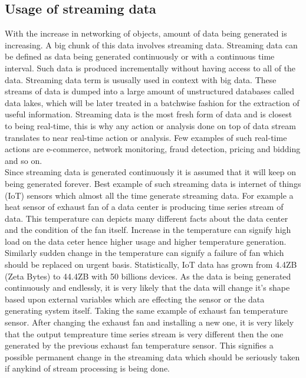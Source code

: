 \documentclass[12pt]{article}
\begin{document}
\subsection{Usage of streaming data}
With the increase in networking of objects, amount of data being generated is increasing. A big chunk of this data involves streaming data. Streaming data can be defined as data being generated continuously or with a continuous time interval. Such data is produced incrementally without having access to all of the data. Streaming data term is ususally used in context with big data. These streams of data is dumped into a large amount of unstructured databases called data lakes, which will be later treated in a batchwise fashion for the extraction of useful information. Streaming data is the most fresh form of data and is closest to being real-time, this is why any action or analysis done on top of data stream translates to near real-time action or analysis. Few examples of such real-time actions are e-commerce, network monitoring, fraud detection, pricing and bidding and so on.\\
\break
Since streaming data is generated continuously it is assumed that it will keep on being generated forever. Best example of such streaming data is internet of things (IoT) sensors which almost all the time generate streaming data. For example a heat sensor of exhaust fan of a data center is producing time series stream of data. This temperature can depicts many different facts about the data center and the condition of the fan itself. Increase in the temperature can signify high load on the data ceter hence higher usage and higher temperature generation. Similarly sudden change in the temperature can signify a failure of fan which should be replaced on urgent basis. Statistically, IoT data has grown from 4.4ZB (Zeta Bytes) to 44.4ZB with 50 billions devices. As the data is being generated continuously and endlessly, it is very likely that the data will change it's shape based upon external variables which are effecting the sensor or the data generating system itself. Taking the same example of exhaust fan temperature sensor. After changing the exhaust fan and installing a new one, it is very likely that the output tempreature time series stream is very different then the one generated by the previous exhaust fan temperature sensor. This signifies a possible permanent change in the streaming data which should be seriously taken if anykind of stream processing is being done.\\
\break
\end{document}
